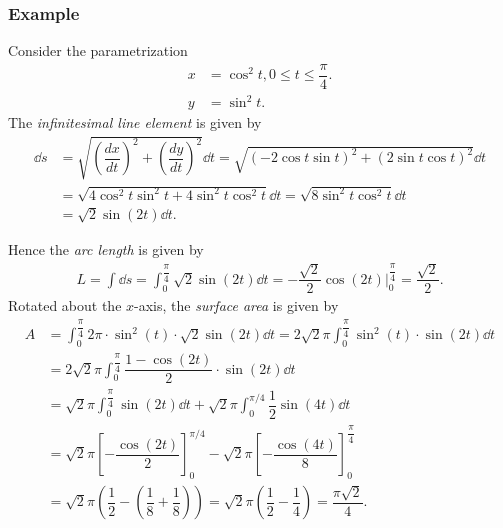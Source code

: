 \subsubsection{Example}
\begin{ex}
Consider the parametrization \begin{align*}
    x &= \cos^2 t, 0 \leq t \leq \dfrac{\pi}{4}.\\
    y &= \sin^2 t.
\end{align*}
The \textit{infinitesimal line element} is given by
\begin{align*}
    \dd s &= \sqrt{\left(\dfrac{dx}{dt}\right)^2 + \left(\dfrac{dy}{dt}\right)^2} \dd t = \sqrt{\left(-2\cos t \sin t\right)^2 + \left(2\sin t \cos t\right)^2} \dd t \\
    &= \sqrt{4\cos^2 t \sin^2 t + 4\sin^2 t \cos^2 t} \dd t  = \sqrt{8 \sin^2 t \cos^2 t } \dd t \\
   &= \sqrt{2} \sin(2t) \dd t.
\end{align*}

Hence the \textit{arc length} is given by
\begin{align*}
    L = \int \dd s = \int_0^{\dfrac{\pi}{4}} \sqrt{2} \sin(2t) \dd t = -\dfrac{\sqrt{2}}{2} \cos(2t) \Big|_0^{\dfrac{\pi}{4}} = \dfrac{\sqrt{2}}{2}.
\end{align*}
Rotated about the $x$-axis, the \textit{surface area} is given by
\begin{align*}
    A &= \int_0^{\dfrac{\pi}{4}} 2\pi \cdot \sin^2(t) \cdot \sqrt{2} \sin(2t) \dd t = 2 \sqrt{2} \pi \int_0^{\dfrac{\pi}{4}} \sin^2(t) \cdot \sin(2t) \dd t \\
    &= 2 \sqrt{2} \pi \int_0^{\dfrac{\pi}{4}} \dfrac{1-\cos(2t)}{2} \cdot \sin(2t) \dd t \\
    &= \sqrt{2} \pi \int_0^{\dfrac{\pi}{4}} \sin(2t) \dd t + \sqrt{2} \pi \int_0^{\pi/4} \dfrac{1}{2} \sin(4t) \dd t \\
    &= \sqrt{2} \pi  \left[ -\dfrac{\cos(2t)}{2} \right]_0^{\pi/4} -  \sqrt{2} \pi \left[ -\dfrac{\cos(4t)}{8} \right]_0^{\dfrac{\pi}{4}} \\
    &= \sqrt{2} \pi \left(\dfrac{1}{2} - \left(\dfrac{1}{8} + \dfrac{1}{8}\right)\right)  = \sqrt{2} \pi \left(\dfrac{1}{2} - \dfrac{1}{4} \right) = \dfrac{\pi \sqrt{2}}{4}.
\end{align*}
\end{ex}

